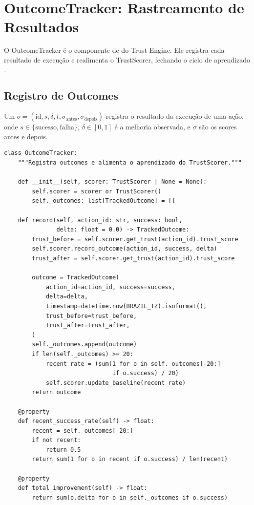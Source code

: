 \section{OutcomeTracker: Rastreamento de Resultados}
\label{sec:outcome-tracker}
\nivelintermediario

O OutcomeTracker é o componente de  do
Trust Engine. Ele registra cada resultado de execução e realimenta o
TrustScorer, fechando o ciclo de aprendizado \cite{opencode2026spec038}.

\subsection{Registro de Outcomes}

\begin{definicao}
Um  $o = (\text{id}, s, \delta, t,
\sigma_{\text{antes}}, \sigma_{\text{depois}})$ registra o resultado
da execução de uma ação, onde $s \in \{\text{sucesso}, \text{falha}\}$,
$\delta \in [0,1]$ é a melhoria observada, e $\sigma$ são os scores
antes e depois.
\end{definicao}

\begin{lstlisting}[style=pythonstyle, caption={OutcomeTracker: registro e aprendizado (trust\_engine.py:402-453)}]
class OutcomeTracker:
    """Registra outcomes e alimenta o aprendizado do TrustScorer."""

    def __init__(self, scorer: TrustScorer | None = None):
        self.scorer = scorer or TrustScorer()
        self._outcomes: list[TrackedOutcome] = []

    def record(self, action_id: str, success: bool,
               delta: float = 0.0) -> TrackedOutcome:
        trust_before = self.scorer.get_trust(action_id).trust_score
        self.scorer.record_outcome(action_id, success, delta)
        trust_after = self.scorer.get_trust(action_id).trust_score

        outcome = TrackedOutcome(
            action_id=action_id, success=success,
            delta=delta,
            timestamp=datetime.now(BRAZIL_TZ).isoformat(),
            trust_before=trust_before,
            trust_after=trust_after,
        )
        self._outcomes.append(outcome)
        if len(self._outcomes) >= 20:
            recent_rate = (sum(1 for o in self._outcomes[-20:]
                               if o.success) / 20)
            self.scorer.update_baseline(recent_rate)
        return outcome

    @property
    def recent_success_rate(self) -> float:
        recent = self._outcomes[-20:]
        if not recent:
            return 0.5
        return sum(1 for o in recent if o.success) / len(recent)

    @property
    def total_improvement(self) -> float:
        return sum(o.delta for o in self._outcomes if o.success)
\end{lstlisting}


